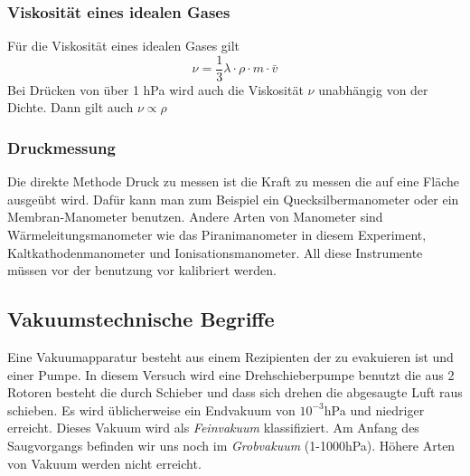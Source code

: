 \documentclass[12pt]{article}
\begin{document}
	\subsubsection{Viskosität eines idealen Gases}
	Für die Viskosität eines idealen Gases gilt
	\begin{equation}
		\nu = \frac{1}{3}\lambda \cdot\rho\cdot m \cdot \bar{v}
	\end{equation}
	Bei Drücken von über 1 hPa wird auch die Viskosität $\nu$ unabhängig von der Dichte. Dann gilt auch $\nu  \propto \rho $
	\subsubsection{Druckmessung}
	Die direkte Methode Druck zu messen ist die Kraft zu messen die auf eine Fläche ausgeübt wird. Dafür kann man zum Beispiel ein Quecksilbermanometer oder ein Membran-Manometer benutzen.
	Andere Arten von Manometer sind Wärmeleitungsmanometer wie das Piranimanometer in diesem Experiment, Kaltkathodenmanometer und Ionisationsmanometer. All diese Instrumente müssen vor der benutzung vor kalibriert werden.
	
	\subsection{Vakuumstechnische Begriffe}
	Eine Vakuumapparatur besteht aus einem Rezipienten der zu evakuieren ist und einer Pumpe. In diesem Versuch wird eine Drehschieberpumpe benutzt die aus 2 Rotoren besteht die durch Schieber und dass sich drehen die abgesaugte Luft raus schieben. Es wird üblicherweise ein Endvakuum von $10^{-3}$hPa und niedriger erreicht. Dieses Vakuum wird als \textit{Feinvakuum} klassifiziert. Am Anfang des Saugvorgangs befinden wir uns noch im \textit{Grobvakuum} (1-1000hPa). Höhere Arten von Vakuum werden nicht erreicht.
	
\end{document}
